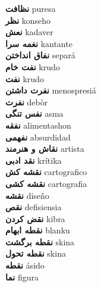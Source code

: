 \textbf{ نظافت  } puresa \\
\textbf{ نظر  } konseho \\
\textbf{ نعش  } kadaver \\
\textbf{ نغمه سرا  } kantante \\
\textbf{ نفاق انداختن  } separá \\
\textbf{ نفت خام  } krudo \\
\textbf{ نفت  } krudo \\
\textbf{ نفرت داشتن  } menospresiá \\
\textbf{ نفرت  } debòr \\
\textbf{ نفس تنگی  } asma \\
\textbf{ نفقه  } alimentashon \\
\textbf{ نفهمی  } absurdidad \\
\textbf{ نقاش و هنرمند  } artista \\
\textbf{ نقد ادبی  } krítika \\
\textbf{ نقشه کش  } cartografico \\
\textbf{ نقشه کشی  } cartografia \\
\textbf{ نقشه  } diseño \\
\textbf{ نقص  } defisiensia \\
\textbf{ نقض کردن  } kibra \\
\textbf{ نقطه ابهام  } blanku \\
\textbf{ نقطه برگشت  } skina \\
\textbf{ نقطه تحول  } skina \\
\textbf{ نقطه  } ásido \\
\textbf{ نما  } figura \\
